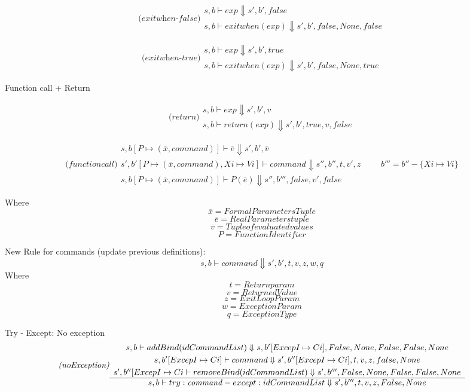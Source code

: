 \documentclass{llncs}
\newcommand{\pfrule}[2]{\begin{array}{c} #1 \\ \hline #2 \end{array}}
\begin{document}
$$
\textit{(exitwhen-false)}
\pfrule
{s,b \vdash exp \Downarrow s', b', false}
{s,b \vdash exitwhen (exp) \Downarrow s', b', false, None, false}
{}
$$


$$
\textit{(exitwhen-true)}
\pfrule
{s,b \vdash exp \Downarrow s', b', true}
{s,b \vdash exitwhen (exp) \Downarrow s', b', false, None, true}
{}
$$






\vspace{20 mm}
Function call + Return

$$
\textit{(return)}
\pfrule
{s,b \vdash exp \Downarrow s', b', v}
{s,b \vdash return (exp) \Downarrow s', b', true, v, false}
{}
$$


$$
\textit{(functioncall)}
\pfrule
{


s,b[P \mapsto (\overline{x}, command) ] \vdash \overline{e} \Downarrow s', b', \overline{v} \\[1mm]
s', b'[P \mapsto (\overline{x}, command), Xi \mapsto Vi] \vdash command \Downarrow s'', b'', \mathit{t}, v', z 
}
{s,b[P \mapsto (\overline{x}, command) ] \vdash P(\overline{e}) \Downarrow s'', b''', false, v', false}
{\qquad b''' = b'' - \{ Xi \mapsto Vi \}}
$$

Where
$$\mathit{\overline{x}} = Formal Parameters Tuple$$
$$\mathit{\overline{e}} = Real Parameters tuple$$
$$\mathit{\overline{v}} = Tuple of evaluated values$$
$$\mathit{P} = FunctionIdentifier$$











\newpage



New Rule for commands (update previous definitions):
$${s,b \vdash command \Downarrow s', b', \mathit{t}, \mathit{v}}, \mathit{z}, w, q $$ 
Where
$$\mathit{t} = Return param$$
$$\mathit{v} = Returned Value$$
$$\mathit{z} = Exit Loop Param$$
$$\mathit{w} = Exception Param$$
$$\mathit{q} = Exception Type$$

\vspace{10mm}
\vspace{10mm}
Try - Except: No exception
{\small $$
\textit{(noException)}
\pfrule
{
{\small s,b \vdash addBind(idCommandList) \Downarrow s, b'[ExcepI \mapsto Ci], False, None, False, False, None}\\[1mm]
{\small s, b'[ExcepI \mapsto Ci] \vdash command \Downarrow s', b''[ExcepI \mapsto Ci], t, v, z, false, None}\\[1mm]
{\small s', b''[ExcepI \mapsto Ci \vdash removeBind(idCommandList) \Downarrow s', b''',False, None, False, False, None}
}
{s,b \vdash try: \mathit{command} - except: idCommandList \Downarrow s', b''', t,v,z, False, None}
{}
$$}
\end{document}
